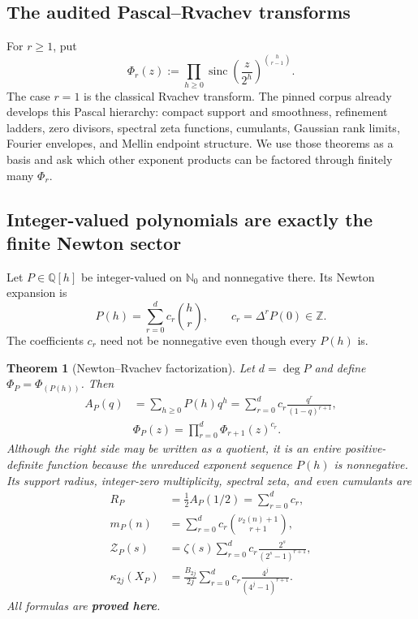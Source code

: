 \documentclass[11pt,oneside]{article}
\numberwithin{equation}{section}
\newtheorem{theorem}{Theorem}[section]
\theoremstyle{definition}
\theoremstyle{remark}
\newcommand{\Q}{\mathbb Q}
\newcommand{\N}{\mathbb N}
\newcommand{\Z}{\mathbb Z}
\newcommand{\sinc}{\operatorname{sinc}}
\newcommand{\statusproved}{\textcolor{deepgreen}{\textbf{proved here}}}
\newcommand{\Zspec}{\mathcal Z}
\begin{document}
\subsection{The audited Pascal--Rvachev transforms}

For $r\ge1$, put
\begin{equation}
 \Phi_r(z)
 :=\prod_{h\ge0}\sinc\!\left(\frac z{2^h}\right)^{\binom h{r-1}}.
 \label{eq:pascal-transform}
\end{equation}
The case $r=1$ is the classical Rvachev transform.  The pinned corpus already develops this
Pascal hierarchy: compact support and smoothness, refinement ladders, zero divisors, spectral
zeta functions, cumulants, Gaussian rank limits, Fourier envelopes, and Mellin endpoint
structure.  We use those theorems as a basis and ask which other exponent products can be
factored through finitely many $\Phi_r$.

\subsection{Integer-valued polynomials are exactly the finite Newton sector}

Let $P\in\Q[h]$ be integer-valued on $\N_0$ and nonnegative there.  Its Newton expansion is
\begin{equation}
 P(h)=\sum_{r=0}^{d}c_r\binom hr,
 \qquad
 c_r=\Delta^rP(0)\in\Z.
 \label{eq:newton-expansion}
\end{equation}
The coefficients $c_r$ need not be nonnegative even though every $P(h)$ is.

\begin{theorem}[Newton--Rvachev factorization]
\label{thm:newton-factorization}
Let $d=\deg P$ and define $\Phi_P=\Phi_{(P(h))}$.  Then
\begin{align}
 A_P(q)
 &=\sum_{h\ge0}P(h)q^h
 =\sum_{r=0}^{d}c_r\frac{q^r}{(1-q)^{r+1}},
 \label{eq:AP-newton}\\
 &\boxed{\Phi_P(z)
 =\prod_{r=0}^{d}\Phi_{r+1}(z)^{c_r}.}
 \label{eq:newton-Phi-factorization}
\end{align}
Although the right side may be written as a quotient, it is an entire positive-definite
function because the unreduced exponent sequence $P(h)$ is nonnegative.  Its support radius,
integer-zero multiplicity, spectral zeta, and even cumulants are
\begin{align}
 R_P
 &=\frac12A_P(1/2)=\sum_{r=0}^{d}c_r,
 \label{eq:RP}\\
 m_P(n)
 &=\sum_{r=0}^{d}c_r\binom{\nu_2(n)+1}{r+1},
 \label{eq:mP}\\
 \Zspec_P(s)
 &=\zeta(s)\sum_{r=0}^{d}c_r
   \frac{2^s}{(2^s-1)^{r+1}},
 \label{eq:ZP}\\
 \kappa_{2j}(X_P)
 &=\frac{B_{2j}}{2j}
   \sum_{r=0}^{d}c_r\frac{4^j}{(4^j-1)^{r+1}}.
 \label{eq:kappaP}
\end{align}
All formulas are \statusproved.
\end{theorem}
\end{document}
